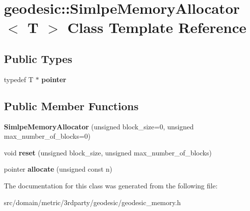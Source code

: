 \hypertarget{classgeodesic_1_1_simlpe_memory_allocator}{}\section{geodesic\+:\+:Simlpe\+Memory\+Allocator$<$ T $>$ Class Template Reference}
\label{classgeodesic_1_1_simlpe_memory_allocator}
\subsection*{Public Types}
\begin{DoxyCompactItemize}
\item 
\hypertarget{classgeodesic_1_1_simlpe_memory_allocator_af86c8ec1a80c901450d5fc86287576d8}{}typedef T $\ast$ {\bfseries pointer}\label{classgeodesic_1_1_simlpe_memory_allocator_af86c8ec1a80c901450d5fc86287576d8}

\end{DoxyCompactItemize}
\subsection*{Public Member Functions}
\begin{DoxyCompactItemize}
\item 
\hypertarget{classgeodesic_1_1_simlpe_memory_allocator_a8d3af574f5c0dc18d97cfb24cb493363}{}{\bfseries Simlpe\+Memory\+Allocator} (unsigned block\+\_\+size=0, unsigned max\+\_\+number\+\_\+of\+\_\+blocks=0)\label{classgeodesic_1_1_simlpe_memory_allocator_a8d3af574f5c0dc18d97cfb24cb493363}

\item 
\hypertarget{classgeodesic_1_1_simlpe_memory_allocator_a689df8804031dc3dd68914c27ef4fa79}{}void {\bfseries reset} (unsigned block\+\_\+size, unsigned max\+\_\+number\+\_\+of\+\_\+blocks)\label{classgeodesic_1_1_simlpe_memory_allocator_a689df8804031dc3dd68914c27ef4fa79}

\item 
\hypertarget{classgeodesic_1_1_simlpe_memory_allocator_a6576b76a002509d57e2c5e19c00c4fb8}{}pointer {\bfseries allocate} (unsigned const n)\label{classgeodesic_1_1_simlpe_memory_allocator_a6576b76a002509d57e2c5e19c00c4fb8}

\end{DoxyCompactItemize}


The documentation for this class was generated from the following file\+:\begin{DoxyCompactItemize}
\item 
src/domain/metric/3rdparty/geodesic/geodesic\+\_\+memory.\+h\end{DoxyCompactItemize}
